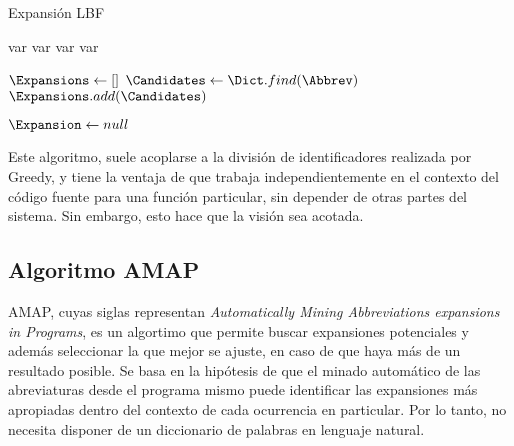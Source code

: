 \begin{algorithm}[H]
\caption{Expansión LBF}
\label{algLBF}
\DontPrintSemicolon
  
  
  \BlankLine
  var \WordList\;
  var \PhraseList\;
  var \StopList\;
  var \Dict\;
  
  \BlankLine
  \If{$\Abbrev \in \StopList$}{
    \KwRet \Abbrev\;
  }
  
  \BlankLine
  
  \BlankLine
  
  \BlankLine 
  $\Expansions \gets []$\;
  $\Candidates \gets \Dict.find(\Abbrev)$\;
  $\Expansions.add(\Candidates)$\;
  
  \BlankLine
  $\Expansion \gets null$\;
  
  \BlankLine
  \KwRet \Expansion\;

\end{algorithm}

Este algoritmo, suele acoplarse a la división de identificadores realizada por Greedy, y tiene la ventaja de que trabaja independientemente en el contexto del código fuente para una función particular, sin depender de otras partes del sistema. Sin embargo, esto hace que la visión sea acotada.

\subsection{Algoritmo AMAP}
AMAP, cuyas siglas representan \textit{Automatically Mining Abbreviations expansions in Programs}, es un algortimo que permite buscar expansiones potenciales y además seleccionar la que mejor se ajuste, en caso de que haya más de un resultado posible.
Se basa en la hipótesis de que el minado automático de las abreviaturas desde el programa mismo puede identificar las expansiones más apropiadas dentro del contexto de cada ocurrencia en particular.
Por lo tanto, no necesita disponer de un diccionario de palabras en lenguaje natural.

